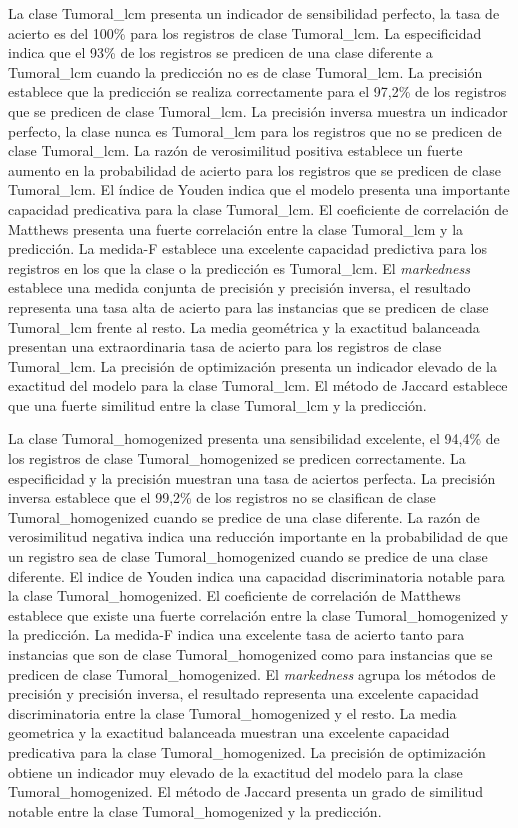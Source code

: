 \bigbreak

La clase Tumoral\_lcm presenta un indicador de sensibilidad perfecto, la tasa de acierto es del 100\% para los registros de clase Tumoral\_lcm. La especificidad indica que el 93\% de los registros se predicen de una clase diferente a Tumoral\_lcm cuando la predicción no es de clase Tumoral\_lcm. La precisión establece que la predicción se realiza correctamente para el 97,2\% de los registros que se predicen de clase Tumoral\_lcm. La precisión inversa muestra un indicador perfecto, la clase nunca es Tumoral\_lcm para los registros que no se predicen de clase Tumoral\_lcm. La razón de verosimilitud positiva establece un fuerte aumento en la probabilidad de acierto para los registros que se predicen de clase Tumoral\_lcm. El índice de Youden indica que el modelo presenta una importante capacidad predicativa para la clase Tumoral\_lcm. El coeficiente de correlación de Matthews presenta una fuerte correlación entre la clase Tumoral\_lcm y la predicción. La medida-F establece una excelente capacidad predictiva para los registros en los que la clase o la predicción es Tumoral\_lcm. El \textit{markedness} establece una medida conjunta de precisión y precisión inversa, el resultado representa una tasa alta de acierto para las instancias que se predicen de clase Tumoral\_lcm frente al resto. La media geométrica y la exactitud balanceada presentan una extraordinaria tasa de acierto para los registros de clase Tumoral\_lcm. La precisión de optimización presenta un  indicador elevado de la exactitud del modelo para la clase Tumoral\_lcm. El método de Jaccard establece que una fuerte similitud entre la clase Tumoral\_lcm y la predicción.

\bigbreak

La clase Tumoral\_homogenized presenta una sensibilidad excelente, el 94,4\% de los registros de clase Tumoral\_homogenized se predicen correctamente. La especificidad y la precisión muestran una tasa de aciertos perfecta. La precisión inversa establece que el 99,2\% de los registros no se clasifican de clase Tumoral\_homogenized cuando se predice de una clase diferente. La razón de verosimilitud negativa indica una reducción importante en la probabilidad de que un registro sea de clase Tumoral\_homogenized cuando se predice de una clase diferente. El indice de Youden indica una capacidad discriminatoria notable para la clase Tumoral\_homogenized. El coeficiente de correlación de Matthews establece que existe una fuerte correlación entre la clase Tumoral\_homogenized y la predicción. La medida-F indica una excelente tasa de acierto tanto para instancias que son de clase Tumoral\_homogenized como para instancias que se predicen de clase Tumoral\_homogenized. El \textit{markedness} agrupa los métodos de precisión y precisión inversa, el resultado representa una excelente capacidad discriminatoria entre la clase Tumoral\_homogenized y el resto. La media geometrica y la exactitud balanceada muestran una excelente capacidad predicativa para la clase Tumoral\_homogenized. La precisión de optimización obtiene un indicador muy elevado de la exactitud del modelo para la clase Tumoral\_homogenized. El método de Jaccard presenta un grado de similitud notable entre la clase Tumoral\_homogenized y la predicción.

